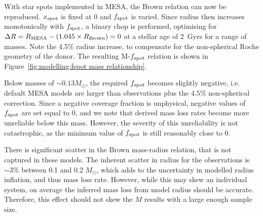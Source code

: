 With star spots implemented in MESA, the Brown relation can now be reproduced.
$x_{\rm spot}$ is fixed at 0 and $f_{\rm spot}$ is varied.
Since radius then increases monotonically with $f_{\rm spot}$, a binary chop is performed, optimising for $\Delta R = R_{\rm MESA} - (1.045\times R_{\rm Brown}) = 0$ at a stellar age of 2~Gyrs for a range of masses. Note the 4.5\% radius increase, to compensate for the non-spherical Roche geometry of the donor.
The resulting M-$f_{\rm spot}$ relation is shown in Figure~\ref{fig:modelling:fspot mass relationship}.

Below masses of $\sim 0.13 M_\odot$, the required $f_{\rm spot}$ becomes slightly negative, i.e. default MESA models are larger than observations plus the $4.5\%$ non-spherical correction.
Since a negative coverage fraction is unphysical, negative values of $f_{\rm spot}$ are set equal to 0, and we note that derived mass loss rates become more unreliable below this mass.
However, the severity of this unreliability is not catastrophic, as the minimum value of $f_{\rm spot}$ is still reasonably close to 0.

There is significant scatter in the Brown mass-radius relation, that is not captured in these models. The inherent scatter in radius for the observations is $\sim 3\%$ between 0.1 and 0.2 $M_\odot$, which adds to the uncertainty in modelled radius inflation, and thus mass loss rate.
However, while this may skew an individual system, on average the inferred mass loss from model radius should be accurate. Therefore, this effect should not skew the $\dot M$ results with a large enough sample size.

